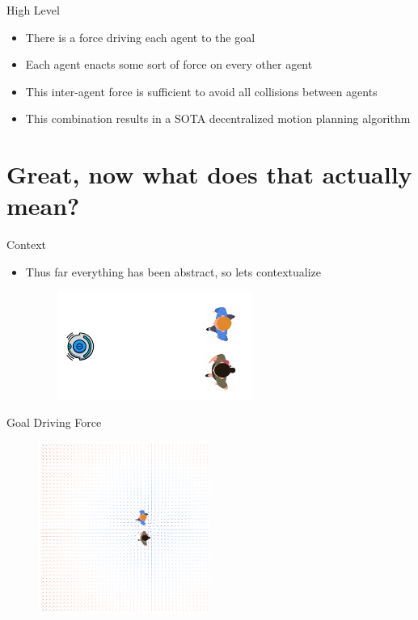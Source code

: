 \documentclass[aspectratio=169,xcolor=dvipsnames]{beamer}
\begin{document}
\begin{frame}{High Level}
  \begin{itemize}
    \item There is a force driving each agent to the goal
    \item Each agent enacts some sort of force on every other agent
    \item This inter-agent force is sufficient to avoid all collisions between agents
    \item This combination results in a SOTA decentralized motion planning algorithm
  \end{itemize}
\end{frame}

\section{Great, now what does that actually mean?}

\begin{frame}{Context}
\begin{itemize}
  \item Thus far everything has been abstract, so lets contextualize

  \begin{figure}
    \includegraphics[width=0.6\textwidth]{imgs/scene.png}
  \end{figure}
\end{itemize}
\end{frame}

\begin{frame}{Goal Driving Force}
  \begin{figure}
    \includegraphics[width=0.5\textwidth]{imgs/goal_directed_force.png}
  \end{figure}
\end{frame}
\end{document}

